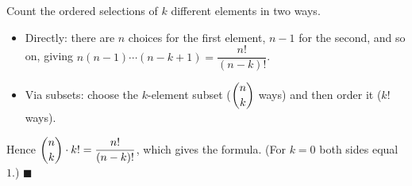Count the ordered selections of $k$ different elements in two ways.
\begin{itemize}
\item Directly: there are $n$ choices for the first element, $n-1$ for the second, and so on, giving $n(n-1)\cdots(n-k+1)=\dfrac{n!}{(n-k)!}$.
\item Via subsets: choose the $k$-element subset ($\dbinom nk$ ways) and then order it ($k!$ ways).
\end{itemize}
Hence $\dbinom nk\cdot k!=\dfrac{n!}{(n-k)!}$, which gives the formula. (For $k=0$ both sides equal $1$.) $\blacksquare$
